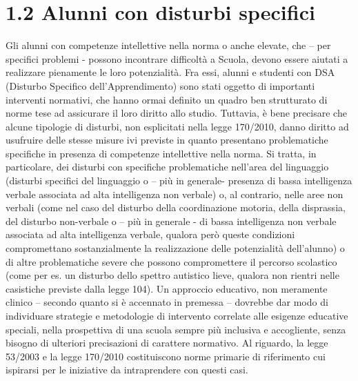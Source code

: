 \section*{1.2 Alunni con disturbi specifici}
Gli alunni con competenze intellettive nella norma o anche elevate, che – per specifici problemi - possono
incontrare difficoltà a Scuola, devono essere aiutati a realizzare pienamente le loro potenzialità. Fra essi,
alunni e studenti con DSA (Disturbo Specifico dell'Apprendimento) sono stati oggetto di importanti
interventi normativi, che hanno ormai definito un quadro ben strutturato di norme tese ad assicurare il loro
diritto allo studio.
Tuttavia, è bene precisare che alcune tipologie di disturbi, non esplicitati nella legge 170/2010, danno diritto
ad usufruire delle stesse misure ivi previste in quanto presentano problematiche specifiche in presenza di
competenze intellettive nella norma. Si tratta, in particolare, dei disturbi con specifiche problematiche
nell'area del linguaggio (disturbi specifici del linguaggio o – più in generale- presenza di bassa intelligenza
verbale associata ad alta intelligenza non verbale) o, al contrario, nelle aree non verbali (come nel caso del
disturbo della coordinazione motoria, della disprassia, del disturbo non-verbale o – più in generale - di bassa
intelligenza non verbale associata ad alta intelligenza verbale, qualora però queste condizioni compromettano
sostanzialmente la realizzazione delle potenzialità dell'alunno) o di altre problematiche severe che possono
compromettere il percorso scolastico (come per es. un disturbo dello spettro autistico lieve, qualora non
rientri nelle casistiche previste dalla legge 104).
Un approccio educativo, non meramente clinico – secondo quanto si è accennato in premessa – dovrebbe dar
modo di individuare strategie e metodologie di intervento correlate alle esigenze educative speciali, nella
prospettiva di una scuola sempre più inclusiva e accogliente, senza bisogno di ulteriori precisazioni di
carattere normativo.
Al riguardo, la legge 53/2003 e la legge 170/2010 costituiscono norme primarie di riferimento cui ispirarsi
per le iniziative da intraprendere con questi casi.
